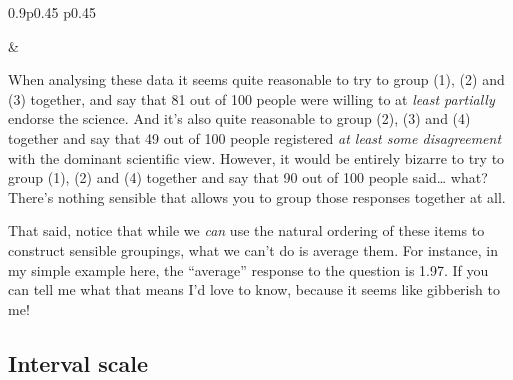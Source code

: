 \documentclass[
  letterpaper,
]{book}
\begin{document}
\begin{table}[ht]
\begin{centerbox}
\begin{threeparttable}
\begin{tabularx}{0.9\textwidth}{p{} p{}}
\hhline{}

 &
 \tabularnewline[-0.5pt]


\end{tabularx} 

\end{threeparttable}\par\end{centerbox}

\end{table}
 

When analysing these data it seems quite reasonable to try to group (1),
(2) and (3) together, and say that 81 out of 100 people were willing to
at \emph{least partially} endorse the science. And it's also quite
reasonable to group (2), (3) and (4) together and say that 49 out of 100
people registered \emph{at least some disagreement} with the dominant
scientific view. However, it would be entirely bizarre to try to group
(1), (2) and (4) together and say that 90 out of 100 people said\ldots{}
what? There's nothing sensible that allows you to group those responses
together at all.

That said, notice that while we \emph{can} use the natural ordering of
these items to construct sensible groupings, what we can't do is average
them. For instance, in my simple example here, the ``average'' response
to the question is 1.97. If you can tell me what that means I'd love to
know, because it seems like gibberish to me!

\hypertarget{interval-scale}{%
\subsection{Interval scale}\label{interval-scale}}
\end{document}
